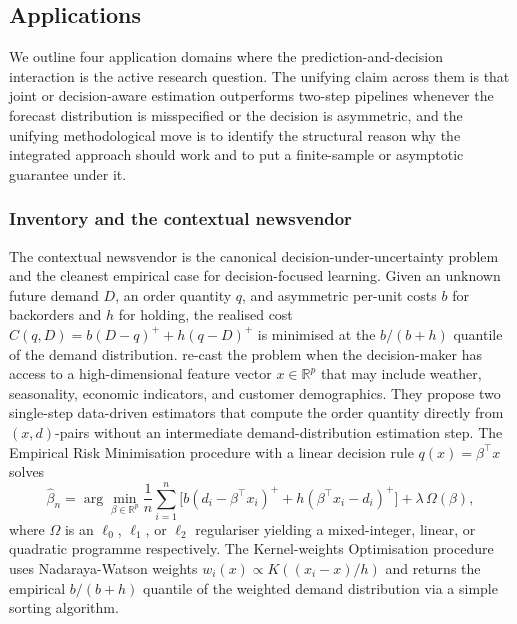 \subsection{Applications}
\label{sec:forecasting_rl_applications}

We outline four application domains where the prediction-and-decision interaction
is the active research question. The unifying claim across them is that joint or
decision-aware estimation outperforms two-step pipelines whenever the forecast
distribution is misspecified or the decision is asymmetric, and the unifying
methodological move is to identify the structural reason why the integrated
approach should work and to put a finite-sample or asymptotic guarantee under
it.

\subsubsection{Inventory and the contextual newsvendor}
\label{sec:app_inventory}

The contextual newsvendor is the canonical decision-under-uncertainty problem
and the cleanest empirical case for decision-focused learning. Given an
unknown future demand $D$, an order quantity $q$, and asymmetric per-unit
costs $b$ for backorders and $h$ for holding, the realised cost
$C(q, D) = b (D - q)^+ + h (q - D)^+$ is minimised at the
$b / (b + h)$ quantile of the demand distribution. \citet{BanRudin2019}
re-cast the problem when the decision-maker has access to a high-dimensional
feature vector $x \in \mathbb R^p$ that may include weather, seasonality,
economic indicators, and customer demographics. They propose two single-step
data-driven estimators that compute the order quantity directly from
$(x, d)$-pairs without an intermediate demand-distribution estimation step.
The Empirical Risk Minimisation procedure with a linear decision rule
$q(x) = \beta^\top x$ solves
\begin{equation}
\hat\beta_n = \arg\min_{\beta \in \mathbb R^p}
  \frac{1}{n} \sum_{i=1}^n
    \bigl[ b (d_i - \beta^\top x_i)^+ + h (\beta^\top x_i - d_i)^+ \bigr]
  + \lambda\, \Omega(\beta),
\label{eq:banrudin_erm}
\end{equation}
where $\Omega$ is an $\ell_0$, $\ell_1$, or $\ell_2$ regulariser yielding a
mixed-integer, linear, or quadratic programme respectively. The Kernel-weights
Optimisation procedure uses Nadaraya-Watson weights $w_i(x) \propto K((x_i - x)
/ h)$ and returns the empirical $b / (b + h)$ quantile of the weighted demand
distribution via a simple sorting algorithm.

